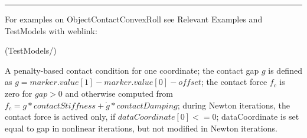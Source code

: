 \vspace{6pt}\par\noindent\rule{\textwidth}{0.4pt}
%
\noindent For examples on ObjectContactConvexRoll see Relevant Examples and TestModels with weblink:
\bi
\item {} (TestModels/)

\ei

%
\newpage


\label{sec:item:ObjectContactCoordinate}
A penalty-based contact condition for one coordinate; the contact gap $g$ is defined as $g=marker.value[1]- marker.value[0] - offset$; the contact force $f_c$ is zero for $gap>0$ and otherwise computed from $f_c = g*contactStiffness + \dot g*contactDamping$; during Newton iterations, the contact force is actived only, if $dataCoordinate[0] <= 0$; dataCoordinate is set equal to gap in nonlinear iterations, but not modified in Newton iterations.
\vspace{12pt}\\

